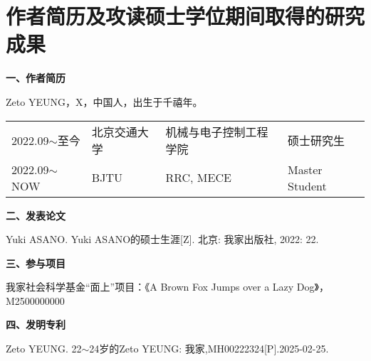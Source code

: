 \chapter*{作者简历及攻读硕士学位期间取得的研究成果}

\textbf{一、作者简历}

Zeto YEUNG，X，中国人，出生于千禧年。

\vspace{-10pt}

\begin{table}[H]
  \centering
  \renewcommand\arraystretch{0.8} %
  \begin{tabular}{llll}
    2022.09$\sim$至今    & 北京交通大学 & 机械与电子控制工程学院 & 硕士研究生 \\
    2022.09$\sim$NOW    & BJTU & RRC, MECE & Master Student \\
  \end{tabular}
\end{table}

\textbf{二、发表论文}

\begin{enumerate}[label={[}\arabic*{]}]
	\item Yuki ASANO. Yuki ASANO的硕士生涯[Z]. 北京: 我家出版社, 2022: 22.
\end{enumerate}

\vspace{18pt}

\textbf{三、参与项目}

\begin{enumerate}[label={[}\arabic*{]}]
	\item 我家社会科学基金“面上”项目：《A Brown Fox Jumps over a Lazy Dog》，M2500000000
\end{enumerate}

\vspace{18pt}

\textbf{四、发明专利}

\begin{enumerate}[label={[}\arabic*{]}]
	\item Zeto YEUNG. 22$\sim$24岁的Zeto YEUNG: 我家,MH00222324[P].2025-02-25.
\end{enumerate}